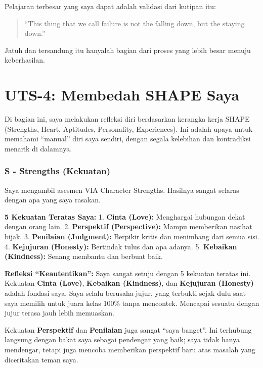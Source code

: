 \documentclass[
  letterpaper,
  DIV=11,
  numbers=noendperiod]{scrreprt}
\begin{document}
Pelajaran terbesar yang saya dapat adalah validasi dari kutipan itu:

\begin{quote}
``This thing that we call failure is not the falling down, but the
staying down.''
\end{quote}

Jatuh dan tersandung itu hanyalah bagian dari proses yang lebih besar
menuju keberhasilan.


\chapter{UTS-4: Membedah SHAPE Saya}\label{uts-4-membedah-shape-saya}

Di bagian ini, saya melakukan refleksi diri berdasarkan kerangka kerja
SHAPE (Strengths, Heart, Aptitudes, Personality, Experiences). Ini
adalah upaya untuk memahami ``manual'' diri saya sendiri, dengan segala
kelebihan dan kontradiksi menarik di dalamnya.

\subsection{S - Strengths (Kekuatan)}\label{s---strengths-kekuatan}

Saya mengambil asesmen VIA Character Strengths. Hasilnya sangat selaras
dengan apa yang saya rasakan.

\textbf{5 Kekuatan Teratas Saya:} 1. \textbf{Cinta (Love):} Menghargai
hubungan dekat dengan orang lain. 2. \textbf{Perspektif (Perspective):}
Mampu memberikan nasihat bijak. 3. \textbf{Penilaian (Judgment):}
Berpikir kritis dan menimbang dari semua sisi. 4. \textbf{Kejujuran
(Honesty):} Bertindak tulus dan apa adanya. 5. \textbf{Kebaikan
(Kindness):} Senang membantu dan berbuat baik.

\textbf{Refleksi ``Keautentikan'':} Saya sangat setuju dengan 5 kekuatan
teratas ini. Kekuatan \textbf{Cinta (Love)}, \textbf{Kebaikan
(Kindness)}, dan \textbf{Kejujuran (Honesty)} adalah fondasi saya. Saya
selalu berusaha jujur, yang terbukti sejak dulu saat saya memilih untuk
juara kelas 100\% tanpa mencontek. Mencapai sesuatu dengan jujur terasa
jauh lebih memuaskan.

Kekuatan \textbf{Perspektif} dan \textbf{Penilaian} juga sangat ``saya
banget''. Ini terhubung langsung dengan bakat saya sebagai pendengar
yang baik; saya tidak hanya mendengar, tetapi juga mencoba memberikan
perspektif baru atas masalah yang diceritakan teman saya.
\end{document}
